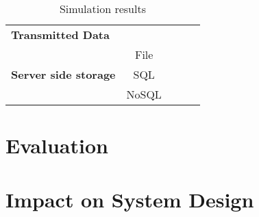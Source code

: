 \begin{table}[h]
\begin{tabular}{l|c|c|c|c}
\multirow{2}{*}{\textbf{Transmitted Data}}               & \cellcolor{green}                                                           & \cellcolor{green}                                       & \cellcolor{green}                                                 & \cellcolor{red}                                       \\ \cline{2-5} 
                                                         & \cellcolor{red}                                                           & \cellcolor{red}                                       & \cellcolor{red}                                                 & \cellcolor{green}                                       \\ \hline
\multirow{3}{*}{\textbf{Server side storage}}            & File                                                        &\cellcolor{yellow}                                      & \cellcolor{purple}                                                 &\cellcolor{yellow}                                      \\ \cline{2-5} 
                                                         & SQL                                                         &\cellcolor{yellow}                                      & \cellcolor{purple}                                                 &\cellcolor{yellow}                                      \\ \cline{2-5} 
                                                         & NoSQL                                                       &\cellcolor{yellow}                                      & \cellcolor{purple}                                                 &\cellcolor{yellow}                                      \\ \hline
\end{tabular}
\caption{Simulation results}
\label{tab:SimulationResults}
\end{table}

\section{Evaluation}

\section{Impact on System Design}